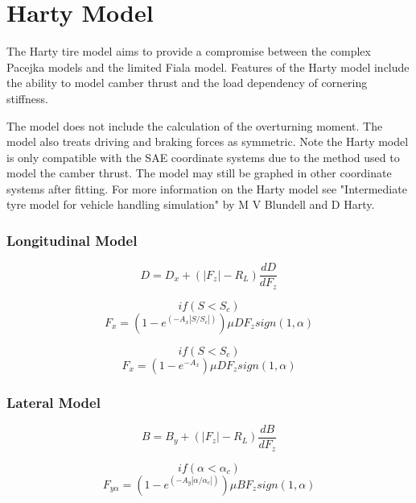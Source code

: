 \section{Harty Model}
\label{sec:HartyModel}
The Harty tire model aims to provide a compromise between the complex Pacejka models and the limited Fiala model. Features of the Harty model include the ability to model camber thrust and the load dependency of cornering stiffness.

The model does not include the calculation of the overturning moment. The model also treats driving and braking forces as symmetric. Note the Harty model is only compatible with the SAE coordinate systems due to the method used to model the camber thrust. The model may still be graphed in other coordinate systems after fitting. For more information on the Harty model see "Intermediate tyre model for vehicle handling simulation" by M V Blundell and D Harty.

\subsubsection*{Longitudinal Model}

\begin{displaymath}
D= D_{x}+(|F_{z}|-R_{L})\frac{dD}{dF_{z}}
\end{displaymath}

\begin{displaymath}if( S < S_{c})\end{displaymath}
\begin{displaymath}
F_{x} = (1-e^{(-A_{x}|S/S_{c}|)})\mu DF_{z} sign(1,\alpha) 
\end{displaymath}

\begin{displaymath}if( S < S_{c})\end{displaymath}
\begin{displaymath}
F_{x} = (1-e^{-A_{x}})\mu DF_{z} sign(1,\alpha) 
\end{displaymath}

\subsubsection*{Lateral Model}

\begin{displaymath}
B= B_{y}+(|F_{z}|-R_{L})\frac{dB}{dF_{z}}
\end{displaymath}

\begin{displaymath}if( \alpha < \alpha_{c})\end{displaymath}
\begin{displaymath}
F_{y\alpha} = (1-e^{(-A_{y}|\alpha/\alpha_{c}|)})\mu BF_{z} sign(1,\alpha) 
\end{displaymath}

